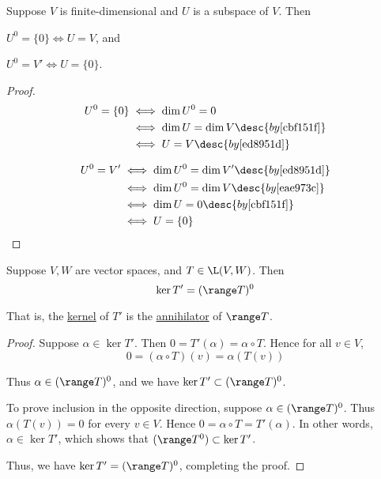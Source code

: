 Suppose $V$ is finite-dimensional and $U$ is a subspace of $V$. Then
\begin{enumerata}
  \item $U^0=\{0\}\iff U=V$, and
  \item $U^0=V'\iff U=\{0\}$.
\end{enumerata}

\begin{proof}
  \begin{align*}
    U^0=\{0\} &\iff\dim U^0=0                               \\
              &\iff\dim U=\dim V\desc{by \autoref{cbf151f}} \\
              &\iff U=V\desc{by \autoref{ed8951d}}
  \end{align*}

  \begin{align*}
    U^0=V' &\iff\dim U^0=\dim V'\desc{by \autoref{ed8951d}} \\
           &\iff\dim U^0=\dim V\desc{by \autoref{eae973c}}  \\
           &\iff\dim U=0\desc{by \autoref{cbf151f}}         \\
           &\iff U=\{0\}
  \end{align*}
\end{proof}

\label{fa7a408}

Suppose $V,W$ are vector spaces, and $T\in\L(V,W)$. Then
$$
  \ker T'=(\range T)^0
$$

That is, the \href{c494931}{kernel} of $T'$ is the \href{af14470}{annihilator}
of $\range T$.

\begin{proof}
  Suppose $\alpha\in\ker T'$. Then $0=T'(\alpha)=\alpha\circ T$. Hence for all
  $v\in V$,
  $$
    0=(\alpha\circ T)(v)=\alpha(T(v))
  $$

  Thus $\alpha\in(\range T)^0$, and we have $\ker T'\subset(\range T)^0$.

  To prove inclusion in the opposite direction, suppose $\alpha\in(\range
  T)^0$. Thus $\alpha(T(v))=0$ for every $v\in V$. Hence $0=\alpha\circ
  T=T'(\alpha)$. In other words, $\alpha\in\ker T'$, which shows that $(\range
  T^0)\subset\ker T'$.

  Thus, we have $\ker T'=(\range T)^0$, completing the proof.
\end{proof}

\label{a44efb3}

